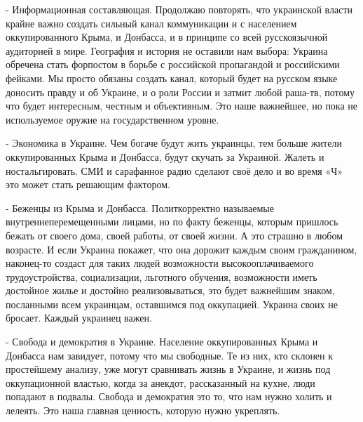 - Информационная составляющая. Продолжаю повторять, что украинской власти
крайне важно создать сильный канал коммуникации и с населением оккупированного
Крыма, и Донбасса, и в принципе со всей русскоязычной аудиторией в мире.
География и история не оставили нам выбора: Украина обречена стать форпостом в
борьбе с российской пропагандой и российскими фейками. Мы просто обязаны
создать канал, который будет на русском языке доносить правду и об Украине, и о
роли России и затмит любой раша-тв, потому что будет интересным, честным и
объективным. Это наше важнейшее, но пока не используемое оружие на
государственном уровне. 

- Экономика в Украине. Чем богаче будут жить украинцы, тем больше жители
оккупированных Крыма и Донбасса, будут скучать за Украиной. Жалеть и
ностальгировать. СМИ и сарафанное радио сделают своё дело и во время «Ч» это
может стать решающим фактором. 

- Беженцы из Крыма и Донбасса. Политкорректно называемые внутреннеперемещенными
лицами, но по факту беженцы, которым пришлось бежать от своего дома, своей
работы, от своей жизни. А это страшно в любом возрасте. И если Украина покажет,
что она дорожит каждым своим гражданином, наконец-то создаст для таких людей
возможности высокооплачиваемого трудоустройства, социализации, льготного
обучения, возможности иметь достойное жилье и достойно реализовываться, это
будет важнейшим знаком, посланными всем украинцам, оставшимся под оккупацией.
Украина своих не бросает. Каждый украинец важен. 

- Свобода и демократия в Украине. Население оккупированных Крыма и Донбасса нам
завидует, потому что мы свободные. Те из них, кто склонен к простейшему
анализу, уже могут сравнивать жизнь в Украине, и жизнь под оккупационной
властью, когда за анекдот, рассказанный на кухне, люди попадают в подвалы.
Свобода и демократия это то, что нам нужно холить и лелеять. Это наша главная
ценность, которую нужно укреплять.
